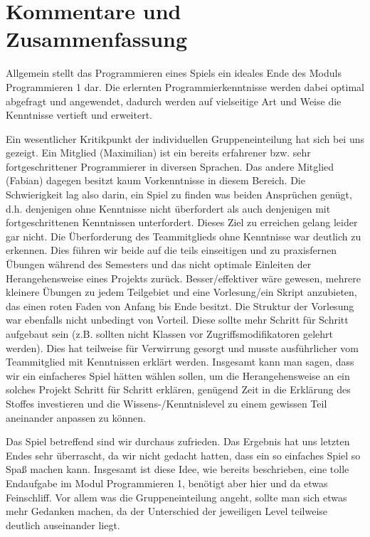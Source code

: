 \documentclass{article}
\begin{document}
\section{Kommentare und Zusammenfassung}

Allgemein stellt das Programmieren eines Spiels ein ideales Ende des Moduls
Programmieren 1 dar.  Die erlernten Programmierkenntnisse werden dabei
optimal abgefragt und angewendet, dadurch werden auf vielseitige Art
und Weise die Kenntnisse vertieft und erweitert.

Ein wesentlicher Kritikpunkt der individuellen Gruppeneinteilung hat sich
bei uns gezeigt. Ein Mitglied (Maximilian) ist ein bereits erfahrener bzw.
sehr fortgeschrittener Programmierer in diversen Sprachen. Das andere
Mitglied (Fabian) dagegen besitzt kaum Vorkenntnisse in diesem Bereich.
Die Schwierigkeit lag also darin, ein Spiel zu finden was beiden Ansprüchen
genügt, d.h. denjenigen ohne Kenntnisse nicht überfordert als auch
denjenigen mit fortgeschrittenen Kenntnissen unterfordert. Dieses
Ziel zu erreichen gelang leider gar nicht. Die Überforderung des Teammitglieds
ohne Kenntnisse war deutlich zu erkennen. Dies führen wir beide auf die teils
einseitigen und zu praxisfernen Übungen während des Semesters und das nicht
optimale Einleiten der Herangehensweise eines Projekts zurück. Besser/effektiver
wäre gewesen, mehrere kleinere Übungen zu jedem Teilgebiet und eine Vorlesung/ein
Skript anzubieten, das einen roten Faden von Anfang bis Ende besitzt. Die Struktur
der Vorlesung war ebenfalls nicht unbedingt von Vorteil. Diese sollte mehr Schritt
für Schritt aufgebaut sein (z.B. sollten nicht Klassen vor Zugriffsmodifikatoren
gelehrt werden). Dies hat teilweise für Verwirrung gesorgt und musste ausführlicher
vom Teammitglied mit Kenntnissen erklärt werden. Insgesamt kann man sagen, dass
wir ein einfacheres Spiel hätten wählen sollen, um die Herangehensweise an ein
solches Projekt Schritt für Schritt erklären, genügend Zeit in die Erklärung
des Stoffes investieren und die Wissens-/Kenntnislevel zu einem gewissen
Teil aneinander anpassen zu können.

Das Spiel betreffend sind wir durchaus zufrieden. Das Ergebnis hat uns
letzten Endes sehr überrascht, da wir nicht gedacht hatten, dass ein so
einfaches Spiel so Spaß machen kann. Insgesamt ist diese Idee, wie bereits
beschrieben, eine tolle Endaufgabe im Modul Programmieren 1, benötigt aber hier
und da etwas Feinschliff. Vor allem was die Gruppeneinteilung angeht, sollte man
sich etwas mehr Gedanken machen, da der Unterschied der jeweiligen Level
teilweise deutlich auseinander liegt.
\newpage
\end{document}
